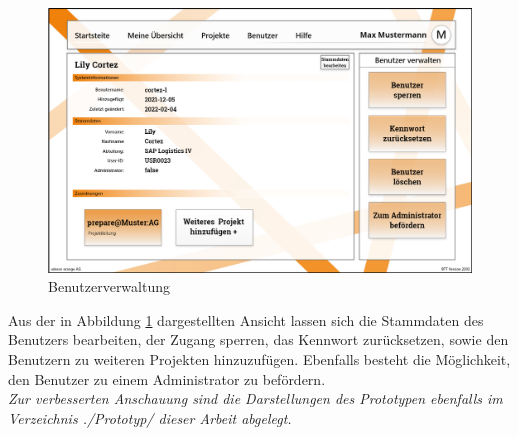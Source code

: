 \begin{figure}[h!]
    \centering
    \includegraphics[scale=0.35]{./Prototyp/043_Benutzer verwalten.png}
    \caption[Prototyp: Benutzerverwaltung]{Benutzerverwaltung}
    \label{fig:Benutzerverwaltung}
\end{figure}
Aus der in Abbildung \ref{fig:Benutzerverwaltung} dargestellten Ansicht lassen sich die Stammdaten des Benutzers bearbeiten, der Zugang sperren, das Kennwort zurücksetzen, sowie den Benutzern zu weiteren Projekten hinzuzufügen. Ebenfalls besteht die Möglichkeit, den Benutzer zu einem Administrator zu befördern.
\vspace{2em}
\\\emph{Zur verbesserten Anschauung sind die Darstellungen des Prototypen ebenfalls im Verzeichnis ./Prototyp/ dieser Arbeit abgelegt.}